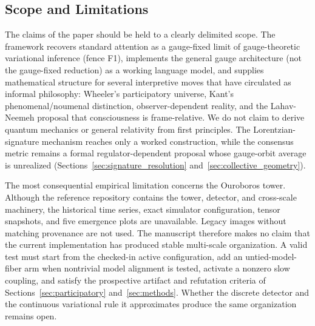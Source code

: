 \documentclass[11pt]{article}
\begin{document}
\subsection{Scope and Limitations}\label{sec:scope_limitations}

The claims of the paper should be held to a clearly delimited scope. The framework recovers standard attention as a gauge-fixed limit of gauge-theoretic variational inference (fence F1), implements the general gauge architecture (not the gauge-fixed reduction) as a working language model, and supplies mathematical structure for several interpretive moves that have circulated as informal philosophy: Wheeler's participatory universe, Kant's phenomenal/noumenal distinction, observer-dependent reality, and the Lahav-Neemeh proposal that consciousness is frame-relative. We do not claim to derive quantum mechanics or general relativity from first principles. The Lorentzian-signature mechanism reaches only a worked construction, while the consensus metric remains a formal regulator-dependent proposal whose gauge-orbit average is unrealized (Sections~\ref{sec:signature_resolution} and~\ref{sec:collective_geometry}).

The most consequential empirical limitation concerns the Ouroboros tower. Although the reference repository contains the tower, detector, and cross-scale machinery, the historical time series, exact simulator configuration, tensor snapshots, and five emergence plots are unavailable. Legacy images without matching provenance are not used. The manuscript therefore makes no claim that the current implementation has produced stable multi-scale organization. A valid test must start from the checked-in active configuration, add an untied-model-fiber arm when nontrivial model alignment is tested, activate a nonzero slow coupling, and satisfy the prospective artifact and refutation criteria of Sections~\ref{sec:participatory} and~\ref{sec:methods}. Whether the discrete detector and the continuous variational rule it approximates produce the same organization remains open.
\end{document}
